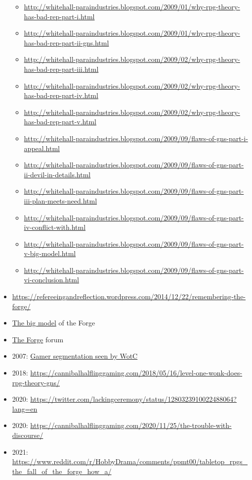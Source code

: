 \documentclass[a4paper, 11pt, twoside]{article}
\begin{document}
\begin{itemize}
\begin{itemize}
\item \url{http://whitehall-paraindustries.blogspot.com/2009/01/why-rpg-theory-has-bad-rep-part-i.html}
\item \url{http://whitehall-paraindustries.blogspot.com/2009/01/why-rpg-theory-has-bad-rep-part-ii-gns.html}
\item \url{http://whitehall-paraindustries.blogspot.com/2009/02/why-rpg-theory-has-bad-rep-part-iii.html}
\item \url{http://whitehall-paraindustries.blogspot.com/2009/02/why-rpg-theory-has-bad-rep-part-iv.html}
\item \url{http://whitehall-paraindustries.blogspot.com/2009/02/why-rpg-theory-has-bad-rep-part-v.html}
\item \url{http://whitehall-paraindustries.blogspot.com/2009/09/flaws-of-gns-part-i-appeal.html}
\item \url{http://whitehall-paraindustries.blogspot.com/2009/09/flaws-of-gns-part-ii-devil-in-details.html}
\item \url{http://whitehall-paraindustries.blogspot.com/2009/09/flaws-of-gns-part-iii-plan-meets-need.html}
\item \url{http://whitehall-paraindustries.blogspot.com/2009/09/flaws-of-gns-part-iv-conflict-with.html}
\item \url{http://whitehall-paraindustries.blogspot.com/2009/09/flaws-of-gns-part-v-big-model.html}
\item \url{http://whitehall-paraindustries.blogspot.com/2009/09/flaws-of-gns-part-vi-conclusion.html}
\end{itemize}
\item \url{https://refereeingandreflection.wordpress.com/2014/12/22/remembering-the-forge/}
\item \href{http://big-model.info/}{The big model} of the Forge
\item \href{http://www.indie-rpgs.com/forge/index.php}{The Forge} forum
\item 2007: \href{https://github.com/orey/ttrpg/blob/master/\_Articles/2007-RSDanceyOnTheWeb-GamerSegmentation.org}{Gamer segmentation seen by WotC}
\item 2018: \url{https://cannibalhalflinggaming.com/2018/05/16/level-one-wonk-does-rpg-theory-gns/}
\item 2020: \url{https://twitter.com/lackingceremony/status/1280323910022488064?lang=en}
\item 2020: \url{https://cannibalhalflinggaming.com/2020/11/25/the-trouble-with-discourse/}
\item 2021: \url{https://www.reddit.com/r/HobbyDrama/comments/ppmt00/tabletop\_rpgs\_the\_fall\_of\_the\_forge\_how\_a/}
\end{itemize}
\end{document}
